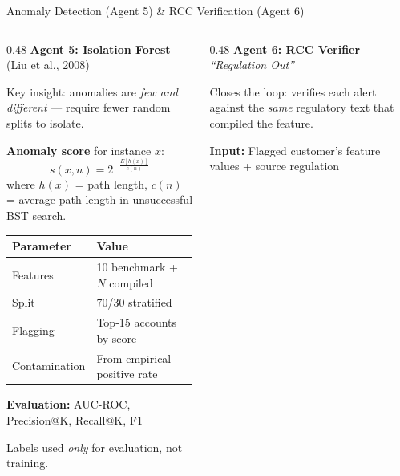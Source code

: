 \documentclass[10pt, aspectratio=169]{beamer}
\newcommand{\hlt}[1]{\textcolor{accentcyan}{#1}}
\newcommand{\hlo}[1]{\textcolor{accentorange}{#1}}
\begin{document}
\begin{frame}{Anomaly Detection (Agent 5) \& RCC Verification (Agent 6)}

\begin{columns}[T]
\begin{column}{0.48\textwidth}
  \textbf{\hlo{Agent 5: Isolation Forest}} {\scriptsize (Liu et al., 2008)}
  \vspace{0.3em}

  \scriptsize
  Key insight: anomalies are \textit{few and different} --- require fewer random splits to isolate.

  \vspace{0.3em}
  \textbf{Anomaly score} for instance \(x\):
  \[
    s(x, n) = 2^{-\frac{E[h(x)]}{c(n)}}
  \]
  where \(h(x)\) = path length, \(c(n)\) = average path length in unsuccessful BST search.

  \vspace{0.3em}
  \begin{tabular}{ll}
    \toprule
    \textbf{Parameter} & \textbf{Value} \\
    \midrule
    Features & 10 benchmark + \(N\) compiled \\
    Split & 70/30 stratified \\
    Flagging & Top-15 accounts by score \\
    Contamination & From empirical positive rate \\
    \bottomrule
  \end{tabular}

  \vspace{0.3em}
  \textbf{Evaluation:} AUC-ROC, Precision@K, Recall@K, F1

  Labels used \textit{only} for evaluation, not training.
\end{column}

\begin{column}{0.48\textwidth}
  \textbf{\hlt{Agent 6: RCC Verifier}} --- \textit{``Regulation Out''}
  \vspace{0.3em}

  \scriptsize
  Closes the loop: verifies each alert against the \textit{same} regulatory text that compiled the feature.

  \vspace{0.3em}
  \textbf{Input:} Flagged customer's feature values + source regulation


\end{column}
\end{columns}
\end{frame}
\end{document}
